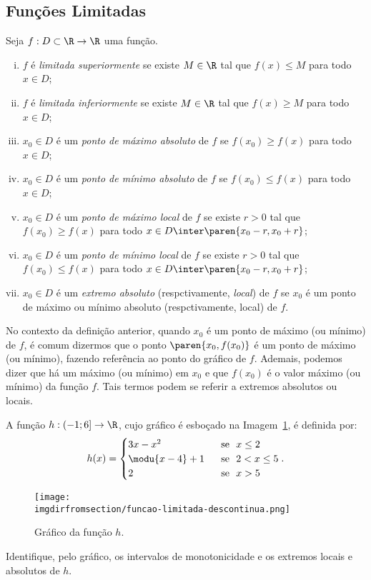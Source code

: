 \subsection{Funções Limitadas}

\begin{definition}
	Seja $f: D \subset \R \to \R$ uma função.
\begin{enumerate}[(i)]
  \item $f$ é \emph{limitada superiormente} se existe $M \in \R$ tal
  que $f(x) \leq M$ para todo $x \in D$;
  \item $f$ é \emph{limitada inferiormente} se existe $M \in \R$ tal
  que $f(x) \geq M$ para todo $x \in D$;
  \item $x_0 \in D$ é um \emph{ponto de máximo absoluto} de $f$ se
  $f(x_0) \geq f(x)$ para todo $x \in D$;
  \item $x_0 \in D$ é um \emph{ponto de mínimo absoluto} de $f$ se
  $f(x_0) \leq f(x)$ para todo $x \in D$;
  \item $x_0 \in D$ é um \emph{ponto de máximo local} de $f$ se
  existe $r>0$ tal que $f(x_0) \geq f(x)$ para todo $x \in D \inter \paren{x_0 - r , x_0+r}$;
  \item $x_0 \in D$ é um \emph{ponto de mínimo local} de $f$ se
  existe $r>0$ tal que $f(x_0) \leq f(x)$ para todo $x \in D \inter \paren{x_0 - r ,
  x_0+r}$;
  \item $x_0 \in D$ é um \emph{extremo absoluto} (respctivamente, \emph{local}) de $f$ se $x_0$ é um ponto de máximo ou mínimo absoluto (respctivamente, local) de $f$.
\end{enumerate}
\end{definition}

\begin{remark}
	No contexto da definição anterior, quando $x_0$ é um ponto de máximo (ou mínimo) de $f$, é comum dizermos que o ponto $\paren {x_0 , f(x_0)}$ é um ponto de máximo (ou mínimo), fazendo referência ao ponto do gráfico de $f$. Ademais, podemos dizer que há um máximo (ou mínimo) em $x_0$ e que $f(x_0)$ é o valor máximo (ou mínimo) da função $f$. Tais termos podem se referir a extremos absolutos ou locais.
\end{remark}

\begin{example}
	A função $h : \left( -1 ; 6 \right] \to \R$, cujo gráfico é esboçado
na Imagem~\ref{img:funcao-limitada-descontinua}, é definida por:
%
$$h(x) = \begin{cases}
								3x-x^2 & \ \text{ se } \ x\leq 2 \\
								\modu{x-4} +1 & \ \text{ se } \ 2 < x \leq 5 \\
								2 & \ \text{ se } \ x > 5 \\
								\end{cases}.$$
%
\begin{figure}[H]
	\centering
	\texttt{[image: \\imgdirfromsection/funcao-limitada-descontinua.png]}
	\caption{Gráfico da função $h$.}
	\label{img:funcao-limitada-descontinua}
\end{figure}
%
Identifique, pelo gráfico, os intervalos de monotonicidade e os extremos locais e absolutos de $h$.
\end{example}

